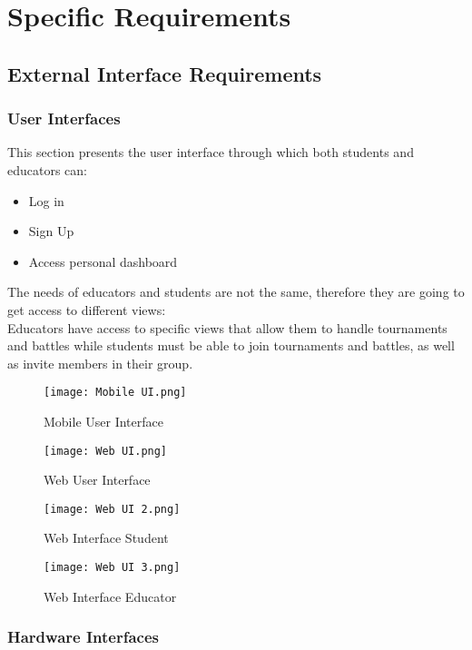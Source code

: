 \documentclass{article}
\begin{document}
\section{Specific Requirements}
\subsection{External Interface Requirements}
\subsubsection{User Interfaces}
This section presents the user interface through which both students and educators can:
\begin{itemize}
    \item Log in
    \item Sign Up
    \item Access personal dashboard
\end{itemize}
The needs of educators and students are not the same, therefore they are going to get access to different views:\\
Educators have access to specific views that allow them to handle tournaments and battles while students must be able to join tournaments and battles, as well as invite members in their group.



\begin{figure}[H]
    \centering
    \texttt{[image: Mobile UI.png]}
    \caption{Mobile User Interface}
\end{figure}

\begin{figure}
    \centering
    \texttt{[image: Web UI.png]}
    \caption{Web User Interface}
\end{figure}

\begin{figure}
    \centering
    \texttt{[image: Web UI 2.png]}
    \caption{Web Interface Student}
\end{figure}

\begin{figure}
    \centering
    \texttt{[image: Web UI 3.png]}
    \caption{Web Interface Educator}
\end{figure}
\newpage
\subsubsection{Hardware Interfaces}
\end{document}
